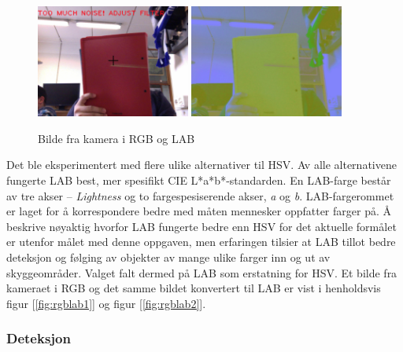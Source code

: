 \begin{figure}[!ht]
	\centering
	{\includegraphics[width=0.45\textwidth]{img/third-rgb.jpg}}
	{\includegraphics[width=0.45\textwidth]{img/third-lab.jpg}}
	\caption{Bilde fra kamera i RGB og LAB}
\end{figure}

Det ble eksperimentert med flere ulike alternativer til HSV. Av alle alternativene fungerte LAB best, mer spesifikt CIE L*a*b*-standarden. En LAB-farge består av tre akser -- \emph{Lightness} og to fargespesiserende akser, \emph{a} og \emph{b}. LAB-fargerommet er laget for å korrespondere bedre med måten mennesker oppfatter farger på. Å beskrive nøyaktig hvorfor LAB fungerte bedre enn HSV for det aktuelle formålet er utenfor målet med denne oppgaven, men erfaringen tilsier at LAB tillot bedre deteksjon og følging av objekter av mange ulike farger inn og ut av skyggeområder. Valget falt dermed på LAB som erstatning for HSV. Et bilde fra kameraet i RGB og det samme bildet konvertert til LAB er vist i henholdsvis figur [\ref{fig:rgblab1}] og figur [\ref{fig:rgblab2}].

\subsubsection{Deteksjon}

